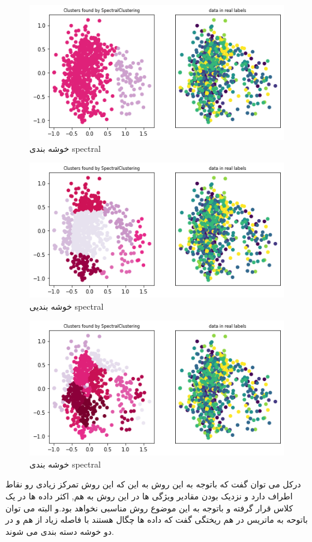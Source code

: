 \documentclass{article}
\begin{document}
\begin{figure}[h]
	\centering
	\includegraphics[width=0.7\linewidth]{Photo/SC3}
	\caption[خوشه بندی spectral]{خوشه بندی spectral}
	\label{fig:sc3}
\end{figure}
\begin{figure}[h]
	\centering
	\includegraphics[width=0.7\linewidth]{Photo/SC4}
	\caption[خوشه بندی spectral]{خوشه بندیی spectral}
	\label{fig:sc4}
\end{figure}
\begin{figure}[h]
	\centering
	\includegraphics[width=0.7\linewidth]{Photo/SC5}
	\caption[خوشه بندی spectral]{خوشه بندی spectral}
	\label{fig:sc5}
\end{figure}
درکل می توان گفت که باتوجه به این روش به این که این روش تمرکز زیادی رو نقاط اطراف دارد و نزدیک بودن مقادیر ویژگی ها در این روش به هم, اکثر داده ها در یک کلاس قرار گرفته و باتوجه به این موضوع روش مناسبی نخواهد بود.و البته می توان باتوحه به ماتریس در هم ریختگی گفت که داده ها چگال هستند با فاصله زیاد از هم و در دو خوشه دسته بندی می شوند.
\end{document}
